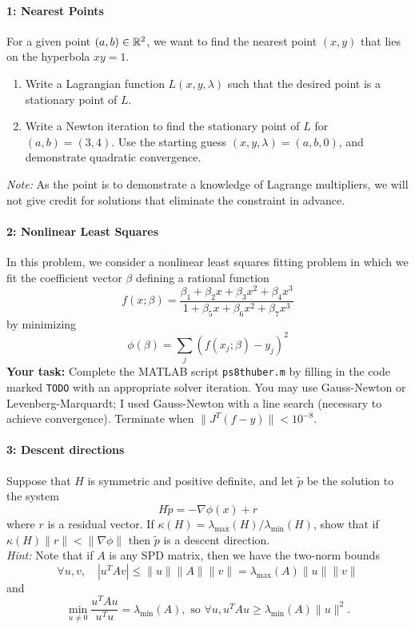 \documentclass[12pt, leqno]{article}
\begin{document}

\paragraph*{1: Nearest Points}
For a given point $(a,b) \in \mathbb{R}^2$, we want to find the nearest
point $(x,y)$ that lies on the hyperbola $xy = 1$.
\begin{enumerate}
\item
  Write a Lagrangian function $L(x,y,\lambda)$ such that the
  desired point is a stationary point of $L$.
\item
  Write a Newton iteration to find the stationary point of $L$
  for $(a,b) = (3,4)$.  Use the starting guess $(x,y,\lambda) =
  (a,b,0)$, and demonstrate quadratic convergence.
\end{enumerate}
{\em Note:} As the point is to demonstrate a knowledge of Lagrange
multipliers, we will not give credit for solutions that eliminate
the constraint in advance.

\paragraph*{2: Nonlinear Least Squares}
In this problem, we consider a nonlinear least squares fitting problem
in which we fit the coefficient vector $\beta$ defining a rational
function
\[
  f(x; \beta) = \frac{\beta_1 + \beta_2 x + \beta_3 x^2 + \beta_4 x^3}
                     {1 + \beta_5 x + \beta_6 x^2 + \beta_7 x^3}
\]
by minimizing
\[
  \phi(\beta) = \sum_j (f(x_j; \beta) - y_j)^2
\]
{\bf Your task:} Complete the MATLAB script {\tt ps8thuber.m} by
filling in the code marked {\tt TODO} with an
appropriate solver iteration.  You may use Gauss-Newton or
Levenberg-Marquardt; I used Gauss-Newton with a line search (necessary
to achieve convergence).  Terminate when $\|J^T (f-y)\| < 10^{-8}$.

\paragraph*{3: Descent directions}
Suppose that $H$ is symmetric and positive definite, and let
$\tilde{p}$ be the solution to the system
\[
  H \tilde{p} = -\nabla \phi(x) + r
\]
where $r$ is a residual vector.  If
$\kappa(H) = \lambda_{\max}(H)/\lambda_{\min}(H)$,
show that if $\kappa(H) \|r\| < \|\nabla \phi\|$
then $\tilde{p}$ is a descent direction. \\[2mm]
{\em Hint:} Note that if $A$ is any SPD matrix, then we have
the two-norm bounds
\[
  \forall u, v, \quad
  |u^T A v| \leq \|u\| \|A\| \|v\| = \lambda_{\max}(A) \|u\| \|v\|
\]
and
\[
  \min_{u \neq 0} \frac{u^T A u}{u^T u} = \lambda_{\min}(A),
  \mbox{ so }
  \forall u, u^T A u \geq \lambda_{\min}(A) \|u\|^2.
\]
\end{document}
